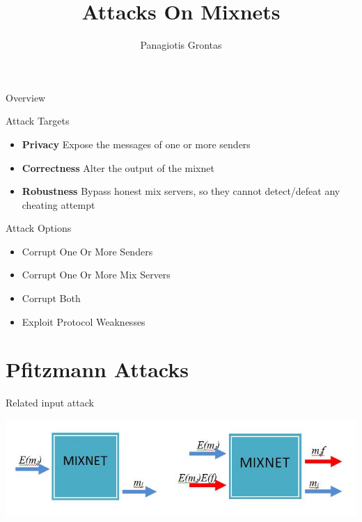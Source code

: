 \documentclass{beamer}
\title{Attacks On Mixnets}
\author{Panagiotis Grontas}
\institute{$\mu\Pi\lambda\forall$  - CoReLab Crypto Group}
\begin{document}
\begin{frame}
\titlepage
\end{frame}

\begin{frame}{Overview}

\begin{block}{Attack Targets}
\begin{itemize}
\item \textbf{Privacy} Expose the messages of one or more senders
\item \textbf{Correctness} Alter the output of the mixnet
\item \textbf{Robustness} Bypass honest mix servers, so they cannot detect/defeat any cheating attempt
\end{itemize}
\end{block}

\begin{block}{Attack Options}
\begin{itemize}
\item Corrupt One Or More Senders
\item Corrupt One Or More Mix Servers
\item Corrupt Both
\item Exploit Protocol Weaknesses
\end{itemize}
\end{block}

\end{frame}


\section{Pfitzmann Attacks}

\begin{frame}{Related input attack}
\begin{center}
\includegraphics[scale=0.4]{PC.JPG}
\end{center}
\end{frame}
\end{document}
